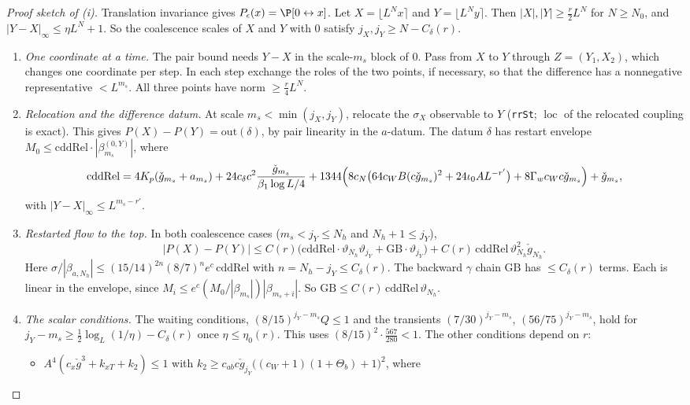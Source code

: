 \documentclass[11pt]{amsart}
\theoremstyle{definition}
\theoremstyle{remark}
\numberwithin{equation}{section}
\begin{document}
\begin{proof}[Proof sketch of (i)]
Translation invariance gives $P_\epsilon(x)=\P[0\leftrightarrow x]$. Let $X=\lfloor L^Nx\rceil$ and $Y=\lfloor L^Ny\rceil$. Then
$|X|,|Y|\ge\frac r2L^N$ for $N\ge N_0$, and $|Y-X|_\infty\le\eta L^N+1$. So the coalescence scales of $X$ and $Y$ with
$0$ satisfy $j_X,j_Y\ge N-C_\delta(r)$.
\begin{enumerate}
\item \emph{One coordinate at a time.} The pair bound needs $Y-X$ in the scale-$m_s$ block of $0$. Pass from $X$ to $Y$
through $Z=(Y_1,X_2)$, which changes one coordinate per step. In each step exchange the roles of the two points, if
necessary, so that the difference has a nonnegative representative $<L^{m_s}$. All three points have norm
$\ge\frac r4L^N$.
\item \emph{Relocation and the difference datum.} At scale $m_s<\min(j_X,j_Y)$, relocate the $\sigma_X$ observable to
$Y$ (\texttt{rrSt}; $\operatorname{loc}$ of the relocated coupling is exact). This gives
$P(X)-P(Y)=\mathrm{out}(\delta)$, by pair linearity in the $a$-datum. The datum $\delta$ has restart envelope
$M_0\le\mathrm{cddRel}\cdot|\beta^{(0,Y)}_{m_s}|$, where
\[
\mathrm{cddRel}=4K_p(\check g_{m_s}+a_{m_s})+24c_\delta c^2\frac{\check g_{m_s}}{\beta_1\log L/4}
+1344\Bigl(8c_N\bigl(64c_WB(c\check g_{m_s})^2+24\iota_0AL^{-r'}\bigr)+8\Gamma_wc_Wc\check g_{m_s}\Bigr)+\check g_{m_s},
\]
with $|Y-X|_\infty\le L^{m_s-r'}$.
\item \emph{Restarted flow to the top.} In both coalescence cases ($m_s<j_Y\le N_h$ and $N_h+1\le j_Y$),
\[
|P(X)-P(Y)|\le C(r)\bigl(\mathrm{cddRel}\cdot\vartheta_{N_h}\vartheta_{j_Y}+\mathrm{GB}\cdot\vartheta_{j_Y}\bigr)
+C(r)\,\mathrm{cddRel}\,\vartheta_{N_h}^2\check g_{N_h}.
\]
Here $\sigma/|\beta_{a,N_h}|\le(15/14)^{2n}(8/7)^ne^{c}\,\mathrm{cddRel}$ with $n=N_h-j_Y\le C_\delta(r)$. The backward
$\gamma$ chain $\mathrm{GB}$ has $\le C_\delta(r)$ terms. Each is linear in the envelope, since
$M_i\le e^{c}(M_0/|\beta_{m_s}|)|\beta_{m_s+i}|$. So $\mathrm{GB}\le C(r)\,\mathrm{cddRel}\,\vartheta_{N_h}$.
\item \emph{The scalar conditions.} The waiting conditions, $(8/15)^{j_Y-m_s}Q\le1$ and the transients
$(7/30)^{j_Y-m_s}$, $(56/75)^{j_Y-m_s}$, hold for $j_Y-m_s\ge\frac12\log_L(1/\eta)-C_\delta(r)$ once
$\eta\le\eta_0(r)$. This uses $(8/15)^2\cdot\frac{567}{280}<1$. The other conditions depend on $r$:
\begin{itemize}
\item $A^4(c_x\check g^3+k_{xT}+k_2)\le1$ with $k_2\ge c_{ab}c\check g_{j_Y}\bigl((c_W+1)(1+\Theta_b)+1\bigr)^2$, where

\end{itemize}
\end{enumerate}
\end{proof}
\end{document}
